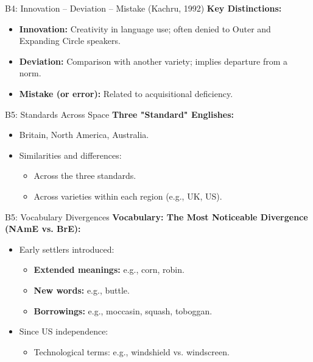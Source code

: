 \documentclass{beamer}
\begin{document}
\begin{frame}{B4: Innovation – Deviation – Mistake (Kachru, 1992)}
\textbf{Key Distinctions:}
\begin{itemize}
    \item \textbf{Innovation:} Creativity in language use; often denied to Outer and Expanding Circle speakers.
    \item \textbf{Deviation:} Comparison with another variety; implies departure from a norm.
    \item \textbf{Mistake (or error):} Related to acquisitional deficiency.
\end{itemize}
\end{frame}

\begin{frame}{B5: Standards Across Space}
\textbf{Three "Standard" Englishes:}
\begin{itemize}
    \item Britain, North America, Australia.
    \item Similarities and differences:
    \begin{itemize}
        \item Across the three standards.
        \item Across varieties within each region (e.g., UK, US).
    \end{itemize}
\end{itemize}
\end{frame}

\begin{frame}{B5: Vocabulary Divergences}
\textbf{Vocabulary: The Most Noticeable Divergence (NAmE vs. BrE):}
\begin{itemize}
    \item Early settlers introduced:
    \begin{itemize}
        \item \textbf{Extended meanings:} e.g., corn, robin.
        \item \textbf{New words:} e.g., buttle.
        \item \textbf{Borrowings:} e.g., moccasin, squash, toboggan.
    \end{itemize}
    \item Since US independence:
    \begin{itemize}
        \item Technological terms: e.g., windshield vs. windscreen.
    \end{itemize}
\end{itemize}
\end{frame}
\end{document}
